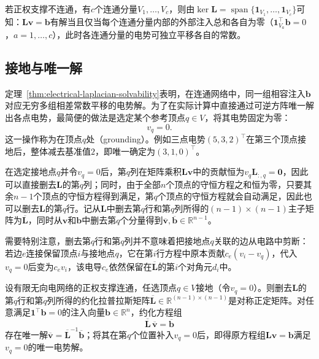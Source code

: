 若正权支撑不连通，有$c$个连通分量$V_1,\ldots,V_c$，则由$\ker\bm L=\operatorname{span}\{\bm 1_{V_1},\ldots,\bm 1_{V_c}\}$可知：$\bm L\bm v=\bm b$有解当且仅当每个连通分量内部的外部注入总和各自为零（$\bm 1_{V_a}^\top\bm b=0$，$a=1,\ldots,c$），此时各连通分量的电势可独立平移各自的常数。

\subsection{接地与唯一解}
\label{sec:electrical-grounding}

定理~\ref{thm:electrical-laplacian-solvability}表明，在连通网络中，同一组相容注入$\bm b$对应无穷多组相差常数平移的电势解。为了在实际计算中直接通过可逆方阵唯一解出各点电势，最简便的做法是选定某个参考顶点$q\in V$，将其电势固定为零：
\[
  v_q = 0.
\]
这一操作称为在顶点$q$处（grounding）。例如三点电势$(5,3,2)^\top$在第三个顶点接地后，整体减去基准值$2$，即唯一确定为$(3,1,0)^\top$。

在选定接地点$q$并令$v_q=0$后，第$q$列在矩阵乘积$\bm L\bm v$中的贡献恒为$v_q\bm L_{:,q}=\bm 0$，因此可以直接删去$\bm L$的第$q$列；同时，由于全部$n$个顶点的守恒方程之和恒为零，只要其余$n-1$个顶点的守恒方程得到满足，第$q$个顶点的守恒方程就会自动满足，因此也可以删去$\bm L$的第$q$行。记从$\bm L$中删去第$q$行和第$q$列所得的$(n-1)\times(n-1)$主子矩阵为$\overline{\bm L}$，同时从$\bm v$和$\bm b$中删去第$q$个分量得到$\overline{\bm v},\overline{\bm b}\in\mathbb R^{n-1}$。

需要特别注意，删去第$q$行和第$q$列并不意味着把接地点$q$关联的边从电路中剪断：若边$e$连接保留顶点$i$与接地点$q$，它在第$i$行方程中原本贡献$c_e(v_i - v_q)$，代入$v_q = 0$后变为$c_e v_i$，该电导$c_e$依然保留在$\overline{\bm L}$的第$i$个对角元$d_i$中。

\begin{theorem}[接地约化系统的正定性与唯一解]
\label{prop:electrical-grounded-system}
设有限无向电网络的正权支撑连通，任选顶点$q\in V$接地（令$v_q=0$）。则删去$\bm L$的第$q$行和第$q$列所得的约化拉普拉斯矩阵$\overline{\bm L}\in\mathbb R^{(n-1)\times(n-1)}$是对称正定矩阵。对任意满足$\bm 1^\top\bm b=0$的注入向量$\bm b\in\mathbb R^n$，约化方程组
\begin{equation}
  \overline{\bm L}\,\overline{\bm v} = \overline{\bm b}
  \label{eq:electrical-grounded-system}
\end{equation}
存在唯一解$\overline{\bm v}=\overline{\bm L}^{-1}\overline{\bm b}$；将其在第$q$个位置补入$v_q=0$后，即得原方程组$\bm L\bm v=\bm b$满足$v_q=0$的唯一电势解。
\end{theorem}

